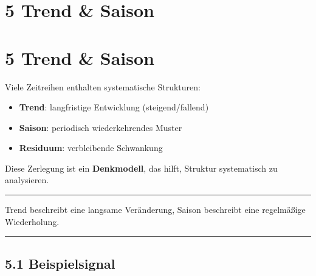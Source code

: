 \documentclass[
  ngerman,
  letterpaper,
  DIV=11]{scrreprt}
\providecommand{\tightlist}{%
  \setlength{\itemsep}{0pt}\setlength{\parskip}{0pt}}
\begin{document}

\chapter{5 Trend \& Saison}\label{trend-saison}


\chapter{5 Trend \& Saison}\label{trend-saison-1}

Viele Zeitreihen enthalten systematische Strukturen:

\begin{itemize}
\tightlist
\item
  \textbf{Trend}: langfristige Entwicklung (steigend/fallend)
\item
  \textbf{Saison}: periodisch wiederkehrendes Muster
\item
  \textbf{Residuum}: verbleibende Schwankung
\end{itemize}

Diese Zerlegung ist ein \textbf{Denkmodell}, das hilft, Struktur
systematisch zu analysieren.

\begin{center}\rule{0.5\linewidth}{0.5pt}\end{center}

\begin{tcolorbox}[enhanced jigsaw, titlerule=0mm, title=\textcolor{quarto-callout-note-color}{\faInfo}\hspace{0.5em}{Merke}, bottomrule=.15mm, opacityback=0, colbacktitle=quarto-callout-note-color!10!white, coltitle=black, opacitybacktitle=0.6, colframe=quarto-callout-note-color-frame, toprule=.15mm, leftrule=.75mm, arc=.35mm, rightrule=.15mm, breakable, bottomtitle=1mm, colback=white, toptitle=1mm, left=2mm]

Trend beschreibt eine langsame Veränderung, Saison beschreibt eine
regelmäßige Wiederholung.

\end{tcolorbox}

\begin{center}\rule{0.5\linewidth}{0.5pt}\end{center}

\section{5.1 Beispielsignal}\label{beispielsignal-1}
\end{document}
